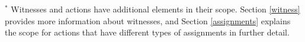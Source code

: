 $\mbox{}^{*}$ Witnesses and actions have additional elements in their scope. Section \ref{witness} provides more information about witnesses, and Section \ref{assignments} explains the scope for actions that have different types of assignments in further detail.

